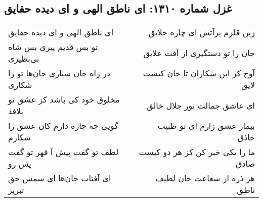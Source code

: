 \begin{center}
\section*{غزل شماره ۱۳۱۰: ای ناطق الهی و ای دیده حقایق}
\label{sec:1310}
\begin{longtable}{l p{0.5cm} r}
ای ناطق الهی و ای دیده حقایق
&&
زین قلزم پرآتش ای چاره خلایق
\\
تو بس قدیم پیری بس شاه بی‌نظیری
&&
جان را تو دستگیری از آفت علایق
\\
در راه جان سپاری جان‌ها تو را شکاری
&&
آوخ کز این شکاران تا جان کیست لایق
\\
مخلوق خود کی باشد کز عشق تو بلافد
&&
ای عاشق جمالت نور جلال خالق
\\
گویی چه چاره دارم کان عشق را شکارم
&&
بیمار عشق زارم ای تو طبیب حاذق
\\
لطف تو گفت پیش آ قهر تو گفت پس رو
&&
ما را یکی خبر کن کز هر دو کیست صادق
\\
ای آفتاب جان‌ها ای شمس حق تبریز
&&
هر ذره از شعاعت جان لطیف ناطق
\\
\end{longtable}
\end{center}
